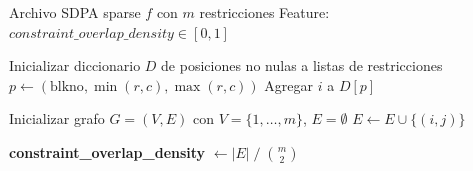 \begin{algorithm}[H]
\caption{Extracción de \textit{constraint\_overlap\_density}}
\label{alg:features_constraint_overlap}
\begin{algorithmic}[1]
\Require Archivo SDPA sparse $f$ con $m$ restricciones
\Ensure  Feature: $constraint\_overlap\_density \in [0,1]$

\State Inicializar diccionario $D$ de posiciones no nulas a listas de restricciones
    \State $p \gets (\text{blkno},\min(r,c),\max(r,c))$
    \State Agregar $i$ a $D[p]$
\EndFor

\State Inicializar grafo $G = (V, E)$ con $V = \{1,\dots,m\}$, $E = \emptyset$
        \State $E \gets E \cup \{(i,j)\}$
    \EndFor
\EndFor

\State \textbf{constraint\_overlap\_density}
       $\gets |E| \;/\; \binom{m}{2}$
\end{algorithmic}
\end{algorithm}
